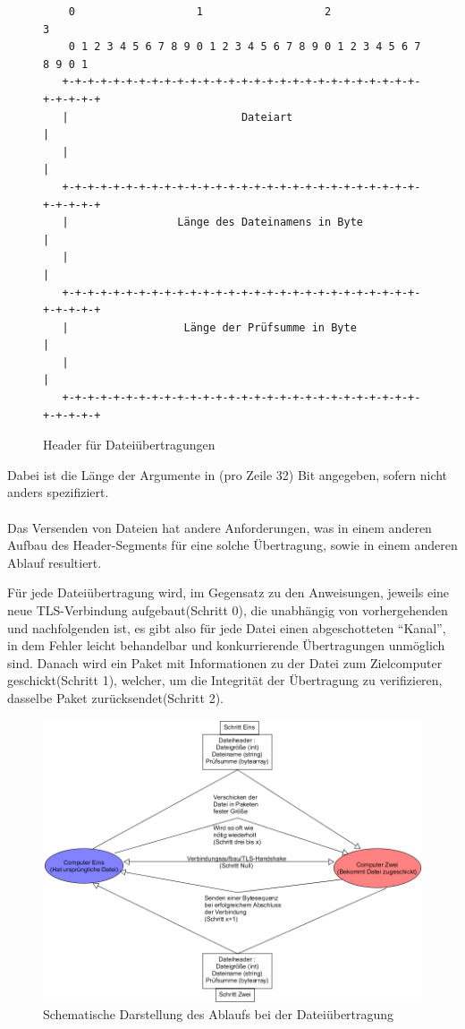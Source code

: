 \begin{figure}[h]
\begin{lstlisting}
	0                   1                   2                   3
    0 1 2 3 4 5 6 7 8 9 0 1 2 3 4 5 6 7 8 9 0 1 2 3 4 5 6 7 8 9 0 1
   +-+-+-+-+-+-+-+-+-+-+-+-+-+-+-+-+-+-+-+-+-+-+-+-+-+-+-+-+-+-+-+-+
   |                           Dateiart                            |
   |                                                               |
   +-+-+-+-+-+-+-+-+-+-+-+-+-+-+-+-+-+-+-+-+-+-+-+-+-+-+-+-+-+-+-+-+
   |                 Länge des Dateinamens in Byte                 |
   |                                                               |
   +-+-+-+-+-+-+-+-+-+-+-+-+-+-+-+-+-+-+-+-+-+-+-+-+-+-+-+-+-+-+-+-+
   |                  Länge der Prüfsumme in Byte                  |
   |                                                               |
   +-+-+-+-+-+-+-+-+-+-+-+-+-+-+-+-+-+-+-+-+-+-+-+-+-+-+-+-+-+-+-+-+
\end{lstlisting}
\caption{Header für Dateiübertragungen}
\label{Datei_Header}
\end{figure}

Dabei ist die Länge der Argumente in (pro Zeile 32) Bit angegeben, sofern nicht anders spezifiziert.\\\\
Das Versenden von Dateien hat andere Anforderungen, was in einem anderen Aufbau des Header-Segments für eine solche Übertragung, sowie in einem anderen Ablauf resultiert.\par
Für jede Dateiübertragung wird, im Gegensatz zu den Anweisungen, jeweils eine neue TLS-Verbindung aufgebaut(Schritt 0), die unabhängig von vorhergehenden und nachfolgenden ist, es gibt also für jede Datei einen abgeschotteten "`Kanal"', in dem Fehler leicht behandelbar und konkurrierende Übertragungen unmöglich sind.
Danach wird ein Paket mit Informationen zu der Datei zum Zielcomputer geschickt(Schritt 1), welcher, um die Integrität der Übertragung zu verifizieren, dasselbe Paket zurücksendet(Schritt 2).\\

\begin{figure}
\includegraphics[scale=.4]{diagramFileProtocol}
\caption{Schematische Darstellung des Ablaufs bei der Dateiübertragung}
\label{file_diagram}
\end{figure}

